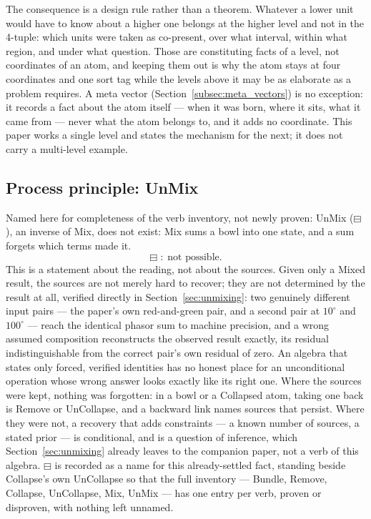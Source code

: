\documentclass[12pt, a4paper]{article}
\begin{document}
The consequence is a design rule rather than a theorem. Whatever a
lower unit would have to know about a higher one belongs at the higher
level and not in the 4-tuple: which units were taken as co-present,
over what interval, within what region, and under what question. Those
are constituting facts of a level, not coordinates of an atom, and
keeping them out is why the atom stays at four coordinates and one
sort tag while the levels above it may be as elaborate as a problem
requires. A meta vector (Section~\ref{subsec:meta_vectors}) is no
exception: it records a fact about the atom itself --- when it was
born, where it sits, what it came from --- never what the atom belongs
to, and it adds no coordinate. This paper works a single level and states the mechanism for
the next; it does not carry a multi-level example.

\subsection{Process principle: UnMix}
\label{subsec:process_principle_unmix}

Named here for completeness of the verb inventory, not newly proven:
UnMix ($\boxminus$), an inverse of Mix, does not exist: Mix sums a bowl into one state, and a sum forgets which terms made it. \[ \boxminus \;:\; \text{not possible.} \] This is a statement about the reading, not about the sources. Given only a Mixed result, the sources are not merely hard to recover; they are
not determined by the result at all, verified directly in
Section~\ref{sec:unmixing}: two genuinely different input pairs ---
the paper's own red-and-green pair, and a second pair at
$10^\circ$ and $100^\circ$ --- reach the identical phasor sum to
machine precision, and a wrong assumed composition reconstructs the
observed result exactly, its residual indistinguishable from the
correct pair's own residual of zero. An algebra that states only
forced, verified identities has no honest place for an unconditional operation whose wrong answer looks exactly like its right one. Where the sources were kept, nothing was forgotten: in a bowl or a Collapsed atom, taking one back is Remove or UnCollapse, and a backward link names sources that persist. Where they were not, a recovery that adds constraints --- a known number of sources, a stated prior --- is conditional, and is a question of inference, which Section~\ref{sec:unmixing} already leaves to the companion paper, not a verb of this algebra. $\boxminus$ is recorded as a name for this already-settled fact, standing beside
Collapse's own UnCollapse so that the full inventory --- Bundle,
Remove, Collapse, UnCollapse, Mix, UnMix --- has one entry per
verb, proven or disproven, with nothing left unnamed.
\end{document}
